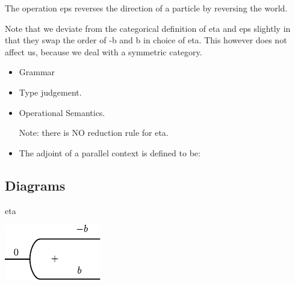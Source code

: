 \documentclass[preprint]{sigplanconf}
\begin{document}
The operation {{eps}} reverses the direction of a particle by
reversing the world. 

Note that we deviate from the categorical definition of {{eta}} and
{{eps}} slightly in that they swap the order of {{-b}} and {{b}} in
choice of {{eta}}. This however does not affect us, because we deal
with a symmetric category.

\begin{itemize}
\item Grammar

\item
Type judgement.


\item
Operational Semantics.

Note: there is NO reduction rule for {{eta}}. 

\item
The adjoint of a parallel context is defined to be:

\end{itemize}

\subsection{Diagrams}

{{eta}}

\begin{center}
  \includegraphics{diagrams/eta.pdf}
\end{center}
\end{document}
